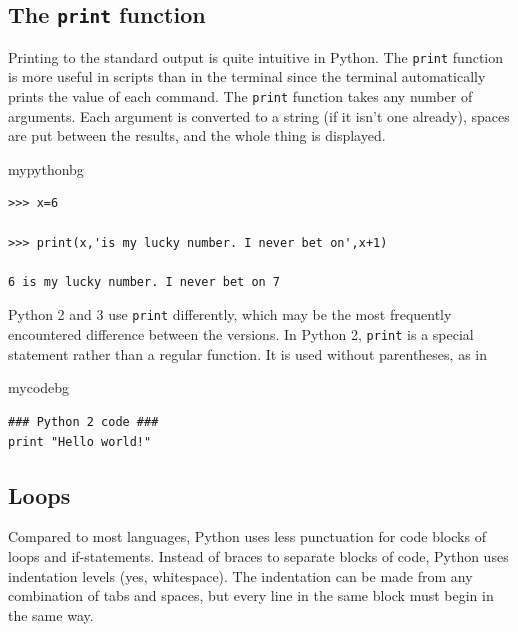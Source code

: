 \subsection{The \texttt{print} function}
Printing to the standard output is quite intuitive in Python.
The \texttt{print} function is more useful in scripts than in the terminal
since the terminal automatically prints the value of each command.
The \texttt{print} function  takes any number of arguments.
Each argument is converted to a string (if it isn't one already),
spaces are put between the results, and the whole thing is displayed.
\begin{tsession}{mypythonbg}
\begin{verbatim}
>>> x=6

>>> print(x,'is my lucky number. I never bet on',x+1)

6 is my lucky number. I never bet on 7
\end{verbatim}
\end{tsession}
Python 2 and 3 use \texttt{print} differently,
which may be the most frequently encountered difference between the versions.
In Python 2, \texttt{print} is a special statement rather than a regular function.
It is used without parentheses, as in
\begin{tsession}{mycodebg}
\begin{verbatim}
### Python 2 code ###
print "Hello world!"
\end{verbatim}
\end{tsession}

\subsection{Loops}
Compared to most languages, Python uses less punctuation for code blocks of loops and if-statements.
Instead of braces to separate blocks of code, Python uses indentation levels (yes, whitespace).
The indentation can be made from any combination of tabs and spaces,
but every line in the same block must begin in the same way.

